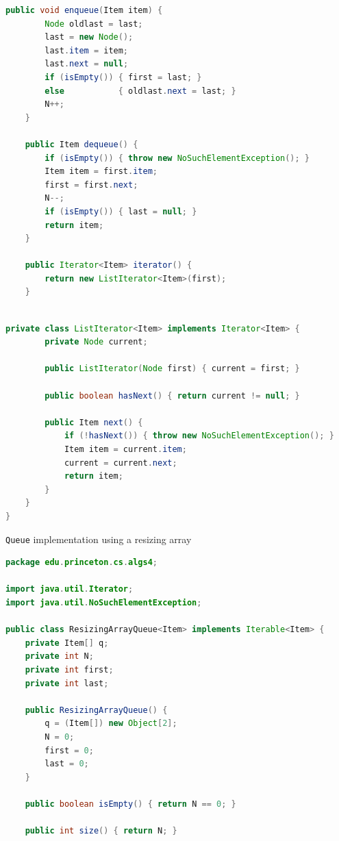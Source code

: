 \documentclass[8pt,a4paper,compress]{beamer}
\begin{document}
\begin{frame}[fragile]
\pause

\begin{lstlisting}[language=Java,style=focusin]
    public void enqueue(Item item) {
        Node oldlast = last;
        last = new Node();
        last.item = item;
        last.next = null;
        if (isEmpty()) { first = last; }
        else           { oldlast.next = last; }
        N++;
    }

    public Item dequeue() {
        if (isEmpty()) { throw new NoSuchElementException(); }
        Item item = first.item;
        first = first.next;
        N--;
        if (isEmpty()) { last = null; }
        return item;
    }

    public Iterator<Item> iterator() { 
        return new ListIterator<Item>(first); 
    }
    
\end{lstlisting}
\end{frame}

\begin{frame}[fragile]
\pause

\begin{lstlisting}[language=Java,style=focusin]
    private class ListIterator<Item> implements Iterator<Item> {
        private Node current;

        public ListIterator(Node first) { current = first; }

        public boolean hasNext() { return current != null; }

        public Item next() {
            if (!hasNext()) { throw new NoSuchElementException(); }
            Item item = current.item;
            current = current.next; 
            return item;
        }
    }
}
\end{lstlisting}
\end{frame}

\begin{frame}[fragile]
\pause

\lstinline{Queue} implementation using a resizing array

\smallskip

\begin{lstlisting}[language=Java,style=focusin]
package edu.princeton.cs.algs4;

import java.util.Iterator;
import java.util.NoSuchElementException;

public class ResizingArrayQueue<Item> implements Iterable<Item> {
    private Item[] q; 
    private int N; 
    private int first; 
    private int last;

    public ResizingArrayQueue() {
        q = (Item[]) new Object[2];
        N = 0;
        first = 0;
        last = 0;
    }

    public boolean isEmpty() { return N == 0; }

    public int size() { return N; }

\end{lstlisting}
\end{frame}
\end{document}
